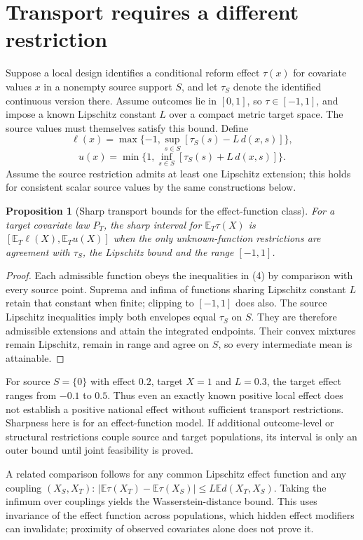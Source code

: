 \documentclass[11pt,a4paper]{article}
\newtheorem{proposition}[theorem]{Proposition}
\newcommand{\E}{\mathbb E}
\begin{document}
\section{Transport requires a different restriction}
Suppose a local design identifies a conditional reform effect $\tau(x)$ for covariate values $x$ in a nonempty source support $S$, and let $\tau_S$ denote the identified continuous version there. Assume outcomes lie in $[0,1]$, so $\tau\in[-1,1]$, and impose a known Lipschitz constant $L$ over a compact metric target space. The source values must themselves satisfy this bound. Define
\[
 \ell(x)=\max\{-1,\sup_{s\in S}[\tau_S(s)-L\,d(x,s)]\},
\]
\[
 u(x)=\min\{1,\inf_{s\in S}[\tau_S(s)+L\,d(x,s)]\}. \tag{4}
\]
Assume the source restriction admits at least one Lipschitz extension; this holds for consistent scalar source values by the same constructions below.

\begin{proposition}[Sharp transport bounds for the effect-function class]
For a target covariate law $P_T$, the sharp interval for $\E_T\tau(X)$ is $[\E_T\ell(X),\E_Tu(X)]$ when the only unknown-function restrictions are agreement with $\tau_S$, the Lipschitz bound and the range $[-1,1]$.
\end{proposition}
\begin{proof}
Each admissible function obeys the inequalities in (4) by comparison with every source point. Suprema and infima of functions sharing Lipschitz constant $L$ retain that constant when finite; clipping to $[-1,1]$ does also. The source Lipschitz inequalities imply both envelopes equal $\tau_S$ on $S$. They are therefore admissible extensions and attain the integrated endpoints. Their convex mixtures remain Lipschitz, remain in range and agree on $S$, so every intermediate mean is attainable.
\end{proof}

For source $S=\{0\}$ with effect $0.2$, target $X=1$ and $L=0.3$, the target effect ranges from $-0.1$ to $0.5$. Thus even an exactly known positive local effect does not establish a positive national effect without sufficient transport restrictions. Sharpness here is for an effect-function model. If additional outcome-level or structural restrictions couple source and target populations, its interval is only an outer bound until joint feasibility is proved.

A related comparison follows for any common Lipschitz effect function and any coupling $(X_S,X_T)$: $|\E\tau(X_T)-\E\tau(X_S)|\le L\E d(X_T,X_S)$. Taking the infimum over couplings yields the Wasserstein-distance bound. This uses invariance of the effect function across populations, which hidden effect modifiers can invalidate; proximity of observed covariates alone does not prove it.
\end{document}
